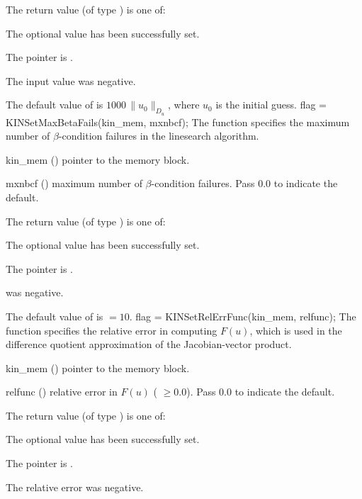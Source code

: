 {
  The return value  (of type ) is one of:
  \begin{args}
  \item[\Id{KIN\_SUCCESS}] 
    The optional value has been successfully set.
  \item[\Id{KIN\_MEM\_NULL}]
    The  pointer is .
  \item[\Id{KIN\_ILL\_INPUT}]
    The input value was negative.
  \end{args}
}
{
  The default value of  is $1000\, \| u_0 \|_{D_u}$,
  where $u_0$ is the initial guess.
}
{
flag = KINSetMaxBetaFails(kin\_mem, mxnbcf);
}
{
  The function  specifies the maximum number of
  $\beta$-condition failures in the linesearch algorithm.
}
{
  \begin{args}
  \item[kin\_mem] ()
    pointer to the {\kinsol} memory block.
  \item[mxnbcf] ()
    maximum number of $\beta$-condition failures.  Pass $0.0$ to indicate the
    default.
  \end{args}
}
{
  The return value  (of type ) is one of:
  \begin{args}
  \item[\Id{KIN\_SUCCESS}] 
    The optional value has been successfully set.
  \item[\Id{KIN\_MEM\_NULL}]
    The  pointer is .
  \item[\Id{KIN\_ILL\_INPUT}]
     was negative.
  \end{args}
}
{
  The default value of  is  $=10$.
}
{
flag = KINSetRelErrFunc(kin\_mem, relfunc);
}
{
  The function  specifies the relative error in 
  computing $F(u)$, which is used in the difference quotient approximation of the
  Jacobian-vector product.
}
{
  \begin{args}[relfunc]
  \item[kin\_mem] ()
    pointer to the {\kinsol} memory block.
  \item[relfunc] ()
    relative error in $F(u)$ ( $\geq 0.0$).  Pass $0.0$ to indicate
    the default.
  \end{args}
}
{
  The return value  (of type ) is one of:
  \begin{args}
  \item[\Id{KIN\_SUCCESS}] 
    The optional value has been successfully set.
  \item[\Id{KIN\_MEM\_NULL}]
    The  pointer is .
  \item[\Id{KIN\_ILL\_INPUT}]
    The relative error was negative.
  \end{args}
}

